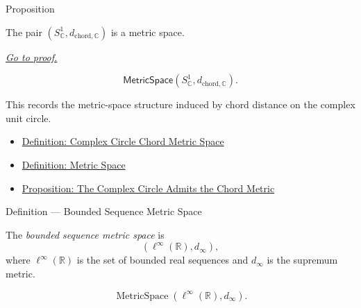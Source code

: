 \begin{propositionbox}{Proposition}
\begin{proposition}
\label{prop:complex-circle-chord-metric-space}
The pair \((S^1_{\mathbb{C}},d_{\mathrm{chord},\mathbb{C}})\) is a metric space.

\smallskip
\noindent
\hyperref[prf:complex-circle-chord-metric-space]{\textit{Go to proof.}}
\end{proposition}
\end{propositionbox}

\begin{remark*}
\[
  \mathsf{MetricSpace}(S^1_{\mathbb{C}},d_{\mathrm{chord},\mathbb{C}}).
\]
\end{remark*}

\begin{remark*}[Interpretation]
This records the metric-space structure induced by chord distance on the complex unit circle.
\end{remark*}

\begin{dependencies}
\begin{itemize}
  \item \hyperref[def:complex-circle-chord-metric-space]{Definition: Complex Circle Chord Metric Space}
  \item \hyperref[def:metric-space]{Definition: Metric Space}
  \item \hyperref[prop:complex-circle-chord-metric]{Proposition: The Complex Circle Admits the Chord Metric}
\end{itemize}
\end{dependencies}

\begin{definitionbox}{Definition --- Bounded Sequence Metric Space}
\begin{definition}
\label{def:bounded-sequence-metric-space}
The \emph{bounded sequence metric space} is
\[
  (\ell^\infty(\mathbb{R}),d_\infty),
\]
where \(\ell^\infty(\mathbb{R})\) is the set of bounded real sequences and
\(d_\infty\) is the supremum metric.
\end{definition}
\end{definitionbox}

\begin{remark*}
\[
\operatorname{MetricSpace}(\ell^\infty(\mathbb{R}),d_\infty).
\]
\end{remark*}

